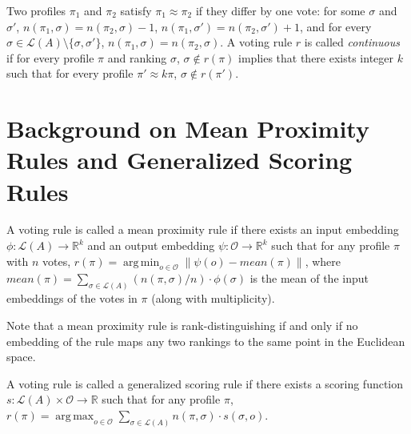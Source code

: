 \documentclass[10pt,letterpaper]{article}
\newcommand{\calL}{{\mathcal{L}}}
\newcommand{\rank}{{\calL(A)}}
\newcommand{\calO}{{\mathcal{O}}}
\DeclareMathOperator*{\argmax}{arg\,max}
\DeclareMathOperator*{\argmin}{arg\,min}
\newenvironment{definition}[1][Definition]{\begin{trivlist}
\item[\hskip \labelsep {\bfseries #1}]}{\end{trivlist}}
\begin{document}

\begin{definition}[Continuity]
Two profiles $\pi_1$ and $\pi_2$ satisfy $\pi_1 \approx \pi_2$ if they differ by one vote: for some $\sigma$ and $\sigma'$, $n(\pi_1,\sigma) = n(\pi_2,\sigma)-1$, $n(\pi_1,\sigma') = n(\pi_2,\sigma')+1$, and for every $\sigma \in \rank\setminus\{\sigma,\sigma'\}$, $n(\pi_1,\sigma) = n(\pi_2,\sigma)$. A voting rule $r$ is called \emph{continuous} if for every profile $\pi$ and ranking $\sigma$, $\sigma \notin r(\pi)$ implies that there exists integer $k$ such that for every profile $\pi' \approx k \pi$, $\sigma \notin r(\pi')$. 
\end{definition}


\section{Background on Mean Proximity Rules and Generalized Scoring Rules}


\begin{definition}[Mean Proximity Rules (Zwicker~\cite{Zwicker08a})]
A voting rule is called a mean proximity rule if there exists an input embedding $\phi : \rank \rightarrow \mathbb{R}^k$ and an output embedding $\psi: \calO \rightarrow \mathbb{R}^k$ such that for any profile $\pi$ with $n$ votes, $r(\pi) = \argmin_{o \in \calO} \|\psi(o) - mean(\pi) \|$, where $mean(\pi) = \sum_{\sigma \in \rank} (n(\pi,\sigma)/n) \cdot \phi(\sigma)$ is the mean of the input embeddings of the votes in $\pi$ (along with multiplicity). 
\end{definition}

Note that a mean proximity rule is rank-distinguishing if and only if no embedding of the rule maps any two rankings to the same point in the Euclidean space. 


\begin{definition}[Generalized Scoring Rules (Zwicker~\cite{Zwicker08a})]
A voting rule is called a generalized scoring rule if there exists a scoring function $s : \rank \times \calO \rightarrow \mathbb{R}$ such that for any profile $\pi$, $r(\pi) = \argmax_{o \in \calO} \sum_{\sigma \in \rank} n(\pi,\sigma) \cdot s(\sigma,o)$. 
\end{definition}
\end{document}

